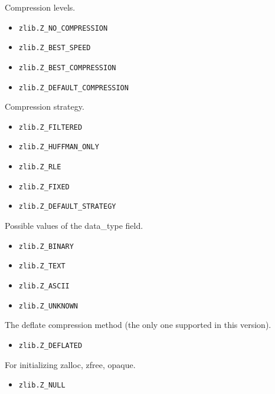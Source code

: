 Compression levels.

\begin{itemize}
\itemsep1pt\parskip0pt
\item
  \texttt{zlib.Z\_NO\_COMPRESSION}
\item
  \texttt{zlib.Z\_BEST\_SPEED}
\item
  \texttt{zlib.Z\_BEST\_COMPRESSION}
\item
  \texttt{zlib.Z\_DEFAULT\_COMPRESSION}
\end{itemize}

Compression strategy.

\begin{itemize}
\itemsep1pt\parskip0pt
\item
  \texttt{zlib.Z\_FILTERED}
\item
  \texttt{zlib.Z\_HUFFMAN\_ONLY}
\item
  \texttt{zlib.Z\_RLE}
\item
  \texttt{zlib.Z\_FIXED}
\item
  \texttt{zlib.Z\_DEFAULT\_STRATEGY}
\end{itemize}

Possible values of the data\_type field.

\begin{itemize}
\itemsep1pt\parskip0pt
\item
  \texttt{zlib.Z\_BINARY}
\item
  \texttt{zlib.Z\_TEXT}
\item
  \texttt{zlib.Z\_ASCII}
\item
  \texttt{zlib.Z\_UNKNOWN}
\end{itemize}

The deflate compression method (the only one supported in this version).

\begin{itemize}
\itemsep1pt\parskip0pt
\item
  \texttt{zlib.Z\_DEFLATED}
\end{itemize}

For initializing zalloc, zfree, opaque.

\begin{itemize}
\itemsep1pt\parskip0pt
\item
  \texttt{zlib.Z\_NULL}
\end{itemize}
